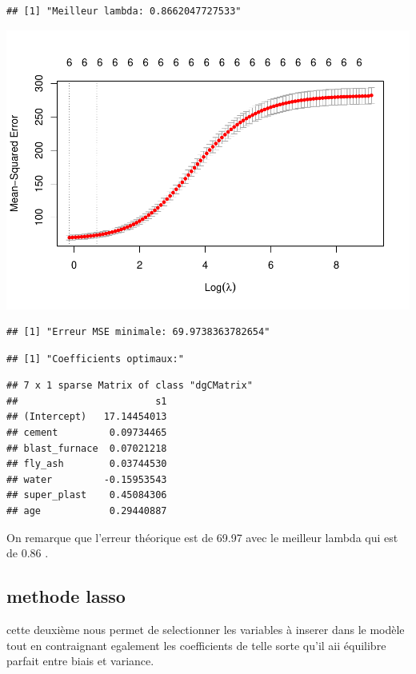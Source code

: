 \documentclass[
  12pt,
]{article}
\begin{document}
\begin{verbatim}
## [1] "Meilleur lambda: 0.8662047727533"
\end{verbatim}

\includegraphics{rmd_final_files/figure-latex/unnamed-chunk-53-2.pdf}

\begin{verbatim}
## [1] "Erreur MSE minimale: 69.9738363782654"
\end{verbatim}

\begin{verbatim}
## [1] "Coefficients optimaux:"
\end{verbatim}

\begin{verbatim}
## 7 x 1 sparse Matrix of class "dgCMatrix"
##                        s1
## (Intercept)   17.14454013
## cement         0.09734465
## blast_furnace  0.07021218
## fly_ash        0.03744530
## water         -0.15953543
## super_plast    0.45084306
## age            0.29440887
\end{verbatim}

On remarque que l'erreur théorique est de 69.97 avec le meilleur lambda
qui est de 0.86 .

\subsection{methode lasso}\label{methode-lasso}

cette deuxième nous permet de selectionner les variables à inserer dans
le modèle tout en contraignant egalement les coefficients de telle sorte
qu'il aii équilibre parfait entre biais et variance.
\end{document}
